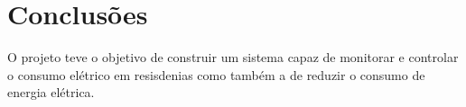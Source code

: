 \chapter{Conclusões}\label{CAP5}

O projeto teve o objetivo de construir um sistema capaz de monitorar e controlar o consumo elétrico em resisdenias como também a de reduzir o consumo de energia elétrica.
